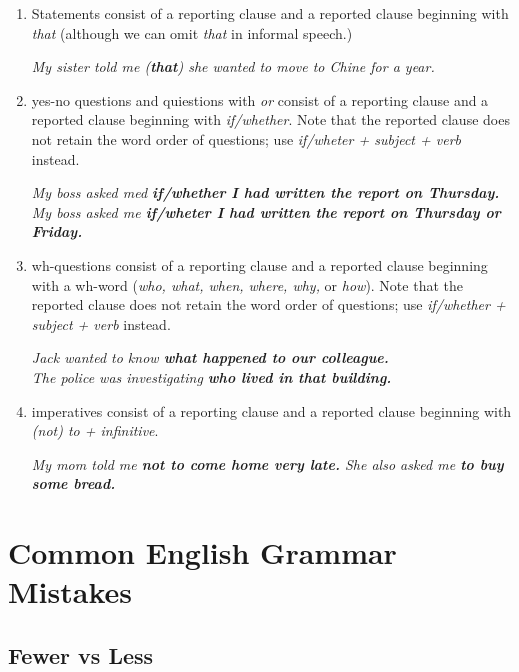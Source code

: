 \documentclass[hidelinks,10pt,a4paper]{article}
\begin{document}
\begin{enumerate}[label=(\alph*)]
	\item Statements consist of a reporting clause and a reported clause beginning with \textit{that} (although we can omit \textit{that} in informal speech.)
		\begin{center}
			\textit{My sister told me (\textbf{that}) she wanted to move to Chine for a year.}
		\end{center}

	\item yes-no questions and quiestions with \textit{or} consist of a reporting clause and a reported clause beginning with \textit{if/whether}. Note that the reported clause does not retain the word order of questions; use \textit{if/wheter + subject + verb} instead.
		\begin{center}
			\textit{My boss asked med \textbf{if/whether I had written the report on Thursday.}}\\
			\textit{My boss asked me \textbf{if/wheter I had written the report on Thursday or Friday.}}
		\end{center}

	\item wh-questions consist of a reporting clause and a reported clause beginning with a wh-word (\textit{who, what, when, where, why,} or \textit{how}). Note that the reported clause does not retain the word order of questions; use \textit{if/whether + subject + verb} instead.
		\begin{center}
			\textit{Jack wanted to know \textbf{what happened to our colleague.}}\\
			\textit{The police was investigating \textbf{who lived in that building.} }
		\end{center}

	\item imperatives consist of a reporting clause and a reported clause beginning with \textit{(not) to + infinitive}.
		\begin{center}
			\textit{My mom told me \textbf{not to come home very late.} She also asked me \textbf{to buy some bread.} }
		\end{center}
\end{enumerate}

\section{Common English Grammar Mistakes}
\subsection{Fewer vs Less}
\end{document}
